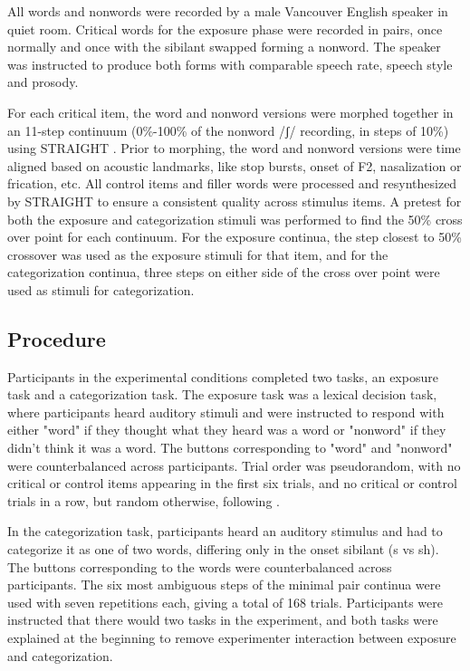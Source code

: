 \documentclass[a4paper,11pt,twocolumn]{article}
\begin{document}
All words and nonwords were recorded by a male Vancouver English speaker in quiet room.  Critical words for the exposure phase were recorded in pairs, once normally and once with the sibilant swapped forming a nonword.  The speaker was instructed to produce both forms with comparable speech rate, speech style and prosody.

For each critical item, the word and nonword versions were morphed together in an 11-step continuum (0\%-100\% of the nonword /ʃ/ recording, in steps of 10\%) using STRAIGHT \cite{Kawahara2008}.  Prior to morphing, the word and nonword versions were time aligned based on acoustic landmarks, like stop bursts, onset of F2, nasalization or frication, etc.  All control items and filler words were processed and resynthesized by STRAIGHT to ensure a consistent quality across stimulus items.  A pretest for both the exposure and categorization stimuli was performed to find the 50\% cross over point for each continuum.  For the exposure continua, the step closest to 50\% crossover was used as the exposure stimuli for that item, and for the categorization continua, three steps on either side of the cross over point were used as stimuli for categorization.

\subsection{Procedure}

Participants in the experimental conditions completed two tasks, an exposure task and a categorization task.  The exposure task was a lexical decision task, where participants heard auditory stimuli and were instructed to respond with either "word" if they thought what they heard was a word or "nonword" if they didn't think it was a word.  The buttons corresponding to "word" and "nonword" were counterbalanced across participants. Trial order was pseudorandom, with no critical or control items appearing in the first six trials, and no critical or control trials in a row, but random otherwise, following \cite{Reinisch2013}.

In the categorization task, participants heard an auditory stimulus and had to categorize it as one of two words, differing only in the onset sibilant (s vs sh).  The buttons corresponding to the words were counterbalanced across participants.  The six most ambiguous steps of the minimal pair continua were used with seven repetitions each, giving a total of 168 trials. Participants were instructed that there would two tasks in the experiment, and both tasks were explained at the beginning to remove experimenter interaction between exposure and categorization.  
\end{document}
